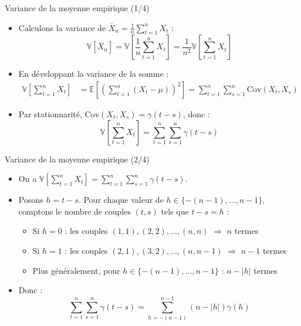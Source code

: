 \documentclass[11pt,aspectratio=169]{beamer}
\newcommand{\E}{\mathbb{E}}
\newcommand{\Var}{\mathbb{V}}
\newcommand{\Cov}{\mathrm{Cov}}
\begin{document}
\begin{frame}{Variance de la moyenne empirique (1/4)}

\begin{itemize}

\item Calculons la variance de $\bar{X}_n = \frac{1}{n} \sum_{t=1}^{n} X_t$ :
  \[
  \Var[\bar{X}_n] = \Var\left[\frac{1}{n} \sum_{t=1}^{n} X_t\right] = \frac{1}{n^2} \Var\left[\sum_{t=1}^{n} X_t\right]
  \]\newline

\item En développant la variance de la somme :
  \begin{align*}
  \Var\left[\sum_{t=1}^{n} X_t\right] &= \E\left[\left(\sum_{t=1}^{n} (X_t - \mu)\right)^2\right] = \sum_{t=1}^{n} \sum_{s=1}^{n} \Cov(X_t, X_s)
  \end{align*}\newline

\item Par stationnarité, $\Cov(X_t, X_s) = \gamma(t-s)$, donc :
  \[
  \Var\left[\sum_{t=1}^{n} X_t\right] = \sum_{t=1}^{n} \sum_{s=1}^{n} \gamma(t-s)
  \]

\end{itemize}

\end{frame}

\begin{frame}{Variance de la moyenne empirique (2/4)}

\begin{itemize}

\item On a $\displaystyle\Var\left[\sum_{t=1}^{n} X_t\right] = \sum_{t=1}^{n} \sum_{s=1}^{n} \gamma(t-s)$.\newline

\item Posons $h = t - s$. Pour chaque valeur de $h \in \{-(n-1), \ldots, n-1\}$, comptons le nombre de couples $(t,s)$ tels que $t - s = h$ :
  \begin{itemize}
    \item Si $h = 0$ : les couples $(1,1), (2,2), \ldots, (n,n)$ $\Rightarrow$ $n$ termes\newline
    \item Si $h = 1$ : les couples $(2,1), (3,2), \ldots, (n,n-1)$ $\Rightarrow$ $n-1$ termes\newline
    \item Plus généralement, pour $h \in \{-(n-1), \ldots, n-1\}$ : $n - |h|$ termes
  \end{itemize}

\item Donc :
  \[
  \sum_{t=1}^{n} \sum_{s=1}^{n} \gamma(t-s) = \sum_{h=-(n-1)}^{n-1} (n - |h|) \gamma(h)
  \]

\end{itemize}

\end{frame}
\end{document}
